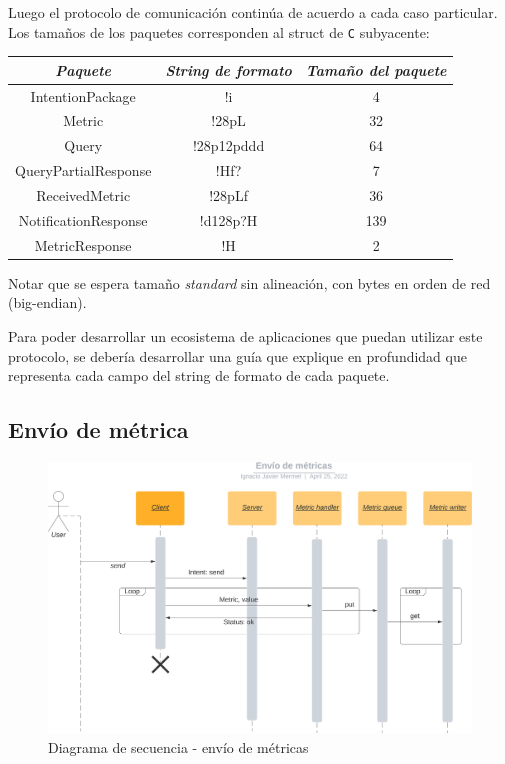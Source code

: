 \documentclass[a4paper,oneside]{article}
\begin{document}
Luego el protocolo de comunicación continúa de acuerdo a cada caso particular. Los tamaños de los paquetes corresponden al struct de \texttt{C} subyacente:

\begin{table}[H]
\centering
\begin{tabular}{c|c|c}
\textit{Paquete}     & \textit{String de formato} & \textit{Tamaño del paquete}  \\
\hline
IntentionPackage     & !i                         & 4                            \\
Metric               & !28pL                      & 32                           \\
Query                & !28p12pddd                 & 64                           \\
QueryPartialResponse & !Hf?                       & 7                            \\
ReceivedMetric       & !28pLf                     & 36                           \\
NotificationResponse & !d128p?H                   & 139                          \\
MetricResponse       & !H                         & 2
\end{tabular}
\end{table}

Notar que se espera tamaño \textit{standard} sin alineación, con bytes en orden de red (big-endian).

Para poder desarrollar un ecosistema de aplicaciones que puedan utilizar este protocolo, se debería desarrollar una guía que explique en profundidad que representa cada campo del string de formato de cada paquete.

\subsection{Envío de métrica}
\begin{figure}[H]
\centering
\includegraphics[width=\textwidth]{images/envio_metricas.png}
\caption{Diagrama de secuencia \-- envío de métricas}
\end{figure}
\end{document}
